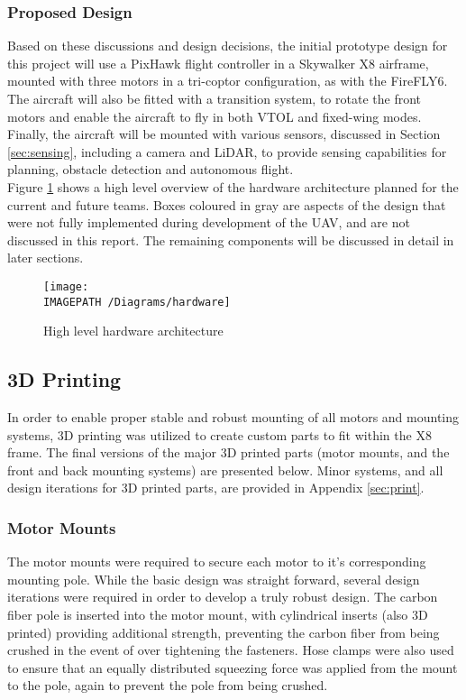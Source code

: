 \subsubsection*{Proposed Design}
Based on these discussions and design decisions, the initial prototype design for this project will use a PixHawk flight controller in a Skywalker X8 airframe, mounted with three motors in a tri-coptor configuration, as with the FireFLY6. The aircraft will also be fitted with a transition system, to rotate the front motors and enable the aircraft to fly in both VTOL and fixed-wing modes. Finally, the aircraft will be mounted with various sensors, discussed in Section \ref{sec:sensing}, including a camera and LiDAR, to provide sensing capabilities for planning, obstacle detection and autonomous flight.\\

Figure \ref{fig:hardwarearch} shows a high level overview of the hardware architecture planned for the current and future teams. Boxes coloured in gray are aspects of the design that were not fully implemented during development of the UAV, and are not discussed in this report. The remaining components will be discussed in detail in later sections.

\begin{figure}[!h]
	\centering
	\texttt{[image: \\IMAGEPATH /Diagrams/hardware]}
	\caption{High level hardware architecture}
	\label{fig:hardwarearch}
\end{figure}

\subsection{3D Printing}
In order to enable proper stable and robust mounting of all motors and mounting systems, 3D printing was utilized to create custom parts to fit within the X8 frame. The final versions of the major 3D printed parts (motor mounts, and the front and back mounting systems) are presented below. Minor systems, and all design iterations for 3D printed parts, are provided in Appendix \ref{sec:print}.\\

\subsubsection*{Motor Mounts}
The motor mounts were required to secure each motor to it's corresponding mounting pole. While the basic design was straight forward, several design iterations were required in order to develop a truly robust design. The carbon fiber pole is inserted into the motor mount, with cylindrical inserts (also 3D printed) providing additional strength, preventing the carbon fiber from being crushed in the event of over tightening the fasteners. Hose clamps were also used to ensure that an equally distributed squeezing force was applied from the mount to the pole, again to prevent the pole from being crushed.

